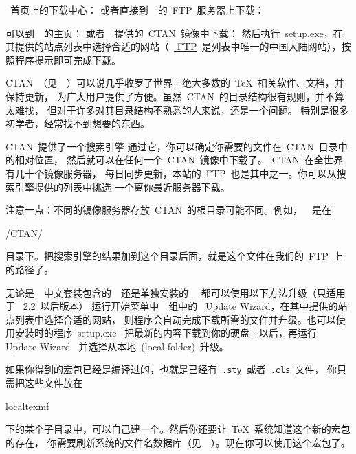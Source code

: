 \documentclass[a4paper]{article}
\begin{document}

\CTeX{}~首页上的下载中心：
或者直接到~\CTeX{}~的~FTP~服务器上下载：


可以到~\MiKTeX{}~的主页：
或者~\CTeX{}~提供的~CTAN~镜像中下载：
然后执行~setup.exe，在其提供的站点列表中选择合适的网站（~\href{ftp://ftp.ctex.org}{\CTeX{}
FTP}~是列表中唯一的中国大陆网站），按照程序提示即可完成下载。


CTAN~（见~~）可以说几乎收罗了世界上绝大多数的~\TeX{}~相关软件、文档，并保持更新，
为广大用户提供了方便。虽然~CTAN~的目录结构很有规则，并不算太难找，
但对于许多对其目录结构不熟悉的人来说，还是一个问题。
特别是很多初学者，经常找不到想要的东西。

CTAN~提供了一个搜索引擎
通过它，你可以确定你需要的文件在~CTAN~目录中的相对位置，
然后就可以在任何一个~CTAN~镜像中下载了。~CTAN~在全世界有几十个镜像服务器，
每日同步更新，本站的~FTP~也是其中之一。你可以从搜索引擎提供的列表中挑选
一个离你最近服务器下载。

注意一点：不同的镜像服务器存放~CTAN~的根目录可能不同。例如，~\CTeXFTP~是在
\begin{prompt}
/CTAN/
\end{prompt}
目录下。把搜索引擎的结果加到这个目录后面，就是这个文件在我们的~FTP~上的路径了。


无论是~\CTeX{}~中文套装包含的~\MiKTeX{}~还是单独安装的~\MiKTeX{}~
都可以使用以下方法升级（只适用于~\MiKTeX{} 2.2~以后版本）
运行开始菜单中~\MiKTeX{}~组中的~\MiKTeX{} Update
Wizard，在其中提供的站点列表中选择合适的网站，
则程序会自动完成下载所需的文件并升级。也可以使用安装时的程序~setup.exe~
把最新的内容下载到你的硬盘上以后，再运行~\MiKTeX{} Update Wizard~
并选择从本地~(local folder)~升级。


如果你得到的宏包已经是编译过的，也就是已经有~\texttt{.sty}~或者~\texttt{.cls}~文件，
你只需把这些文件放在
\begin{prompt}
localtexmf\tex\latex\
\end{prompt}
下的某个子目录中，可以自己建一个。然后你还要让~\TeX{}~系统知道这个新的宏包的存在，
你需要刷新系统的文件名数据库（见~~）。现在你可以使用这个宏包了。
\end{document}
